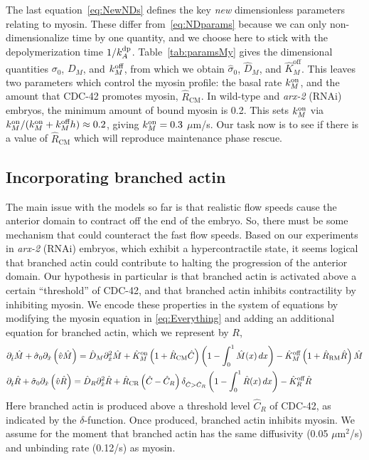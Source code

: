 \documentclass[11pt]{article}
\newcommand{\red}[1]{\color{red}#1\normalcolor}
\newcommand{\6}[1]{#1_{\text{6}}}
\newcommand{\3}[1]{#1_{\text{3}}}
\begin{document}
The last equation\ \eqref{eq:NewNDs} defines the key \emph{new} dimensionless parameters relating to myosin. These differ from\ \eqref{eq:NDparams} because we can only non-dimensionalize time by one quantity, and we choose here to stick with the depolymerization time $1/k^\text{dp}_A$. Table\ \ref{tab:paramsMy} gives the dimensional quantities ${\sigma}_0$, $D_M$, and $k^\text{off}_M$, from which we obtain $\hat \sigma_0$, $\hat D_M$, and $\hat K^\text{off}_M$. This leaves two parameters which control the myosin profile: the basal rate $k^\text{on}_M$, and the amount that CDC-42 promotes myosin, $\hat R_\text{CM}$. In wild-type and \emph{arx-2} (RNAi) embryos, the minimum amount of bound myosin is 0.2. This sets $k^\text{on}_M$ via $k^\text{on}_M/(k^\text{on}_M+k^\text{off}_M h) \approx 0.2$, giving $k^\text{on}_M=0.3$ $\mu$m/s. Our task now is to see if there is a value of $\hat R_\text{CM}$ which will reproduce maintenance phase rescue.

\subsection{Incorporating branched actin}
The main issue with the models so far is that realistic flow speeds cause the anterior domain to contract off the end of the embryo. So, there must be some mechanism that could counteract the fast flow speeds. Based on our experiments in \emph{arx-2} (RNAi) embryos, which exhibit a hypercontractile state, it seems logical that branched actin could contribute to halting the progression of the anterior domain. Our hypothesis in particular is that branched actin is activated above a certain ``threshold'' of CDC-42, and that branched actin inhibits contractility by inhibiting myosin. We encode these properties in the system of equations by modifying the myosin equation in \eqref{eq:Everything} and adding an additional equation for branched actin, which we represent by $R$,  
\begin{align}
\nonumber
&\partial_{\hat{t}} \hat{M} +\hat{\sigma}_0  \partial_{\hat{x}} \left(\hat{v} \hat{M} \right) =\hat{D}_M \partial_{\hat{x}}^2 \hat{M} +\hat{K}^\text{on}_M \left(1+\hat{R}_\text{CM} \hat C\right) \left(1-\int_0^1  \hat{M}(x) \, dx\right)- \hat{K}^\text{off}_M \left(1+\hat R_\text{RM} \hat R\right) \hat{M}\\
\label{eq:BAll}
&\partial_{\hat{t}} \hat{R} +\hat{\sigma}_0  \partial_{\hat{x}} \left(\hat{v} \hat{R} \right) =\hat{D}_R \partial_{\hat{x}}^2 \hat{R} +\hat R_\text{CR} \left(\hat C-\hat C_R\right) {\delta}_{\hat C > \hat C_R} \left(1-\int_0^1  \hat{R}(x) \, dx\right)- \hat{K}^\text{off}_R \hat{R}
\end{align}
Here branched actin is produced above a threshold level $\hat C_R$ of CDC-42, as indicated by the $\delta$-function. Once produced, branched actin inhibits myosin. \red{We assume for the moment that branched actin has the same diffusivity (0.05 $\mu$m$^2$/s) and unbinding rate (0.12/s) as myosin.}
\end{document}
